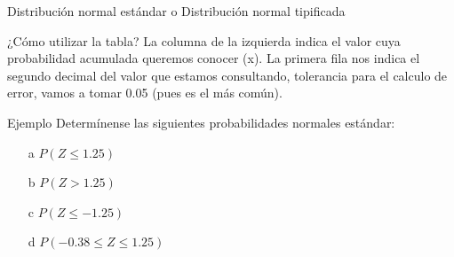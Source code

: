 \documentclass[11pt]{beamer}
\begin{document}
      \begin{frame}{Distribución normal estándar o Distribución normal tipificada}
          \begin{block}{¿Cómo utilizar la tabla?}
              La columna de la izquierda indica el valor cuya probabilidad acumulada queremos conocer (x). La primera fila nos indica el segundo decimal del valor que estamos consultando, tolerancia para el calculo de error, vamos a tomar 0.05 (pues es el m\'as común).
          \end{block}
          \begin{block}{Ejemplo}
              Determínense las siguientes probabilidades normales estándar:
              \begin{itemize}
                  \item[a] $P(Z \leq 1.25)$
                  \item[b] $P(Z >
1.25)$
                  \item[c] $P(Z \leq -1.25)$
                  \item[d] $P(-0.38 \leq Z \leq 1.25)$
              \end{itemize}
          \end{block}
      \end{frame}
\end{document}
